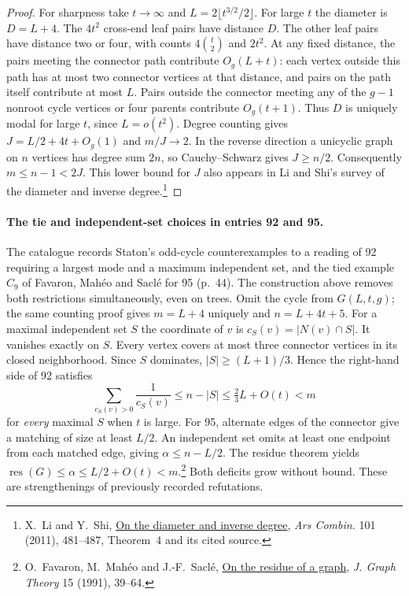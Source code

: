 \documentclass[11pt,a4paper]{article}
\theoremstyle{remark}\newtheorem*{remark}{Remark}
\begin{document}
\begin{proof}
For sharpness take $t\to\infty$ and $L=2\lfloor t^{3/2}/2\rfloor$. For large $t$ the diameter is $D=L+4$. The $4t^2$ cross-end leaf pairs have distance $D$. The other leaf pairs have distance two or four, with counts $4\binom t2$ and $2t^2$. At any fixed distance, the pairs meeting the connector path contribute $O_g(L+t)$: each vertex outside this path has at most two connector vertices at that distance, and pairs on the path itself contribute at most $L$. Pairs outside the connector meeting any of the $g-1$ nonroot cycle vertices or four parents contribute $O_g(t+1)$. Thus $D$ is uniquely modal for large $t$, since $L=o(t^2)$. Degree counting gives $J=L/2+4t+O_g(1)$ and $m/J\to2$. In the reverse direction a unicyclic graph on $n$ vertices has degree sum $2n$, so Cauchy--Schwarz gives $J\ge n/2$. Consequently $m\le n-1<2J$. This lower bound for $J$ also appears in Li and Shi's survey of the diameter and inverse degree.\footnote{X.~Li and Y.~Shi, \href{https://cfc.nankai.edu.cn/_upload/article/files/df/71/c19cfafd423ba2120480295ecad0/f08970b4-64b5-4620-9daf-a3f33905eeaa.pdf}{On the diameter and inverse degree}, \emph{Ars Combin.} 101 (2011), 481--487, Theorem~4 and its cited source.}
\end{proof}

\paragraph{The tie and independent-set choices in entries 92 and 95.}
The catalogue records Staton's odd-cycle counterexamples to a reading of 92 requiring a largest mode and a maximum independent set, and the tied example $C_9$ of Favaron, Mah\'eo and Sacl\'e for 95 (p.~44). The construction above removes both restrictions simultaneously, even on trees. Omit the cycle from $G(L,t,g)$; the same counting proof gives $m=L+4$ uniquely and $n=L+4t+5$. For a maximal independent set $S$ the coordinate of $v$ is $c_S(v)=|N(v)\cap S|$. It vanishes exactly on $S$. Every vertex covers at most three connector vertices in its closed neighborhood. Since $S$ dominates, $|S|\ge (L+1)/3$. Hence the right-hand side of 92 satisfies
\[
 \sum_{c_S(v)>0}\frac{1}{c_S(v)}\le n-|S|\le \tfrac23 L+O(t)<m
\]
for \emph{every} maximal $S$ when $t$ is large. For 95, alternate edges of the connector give a matching of size at least $L/2$. An independent set omits at least one endpoint from each matched edge, giving $\alpha\le n-L/2$. The residue theorem yields $\operatorname{res}(G)\le\alpha\le L/2+O(t)<m$.\footnote{O.~Favaron, M.~Mah\'eo and J.-F.~Sacl\'e, \href{https://doi.org/10.1002/jgt.3190150107}{On the residue of a graph}, \emph{J. Graph Theory} 15 (1991), 39--64.} Both deficits grow without bound. These are strengthenings of previously recorded refutations.
\end{document}
